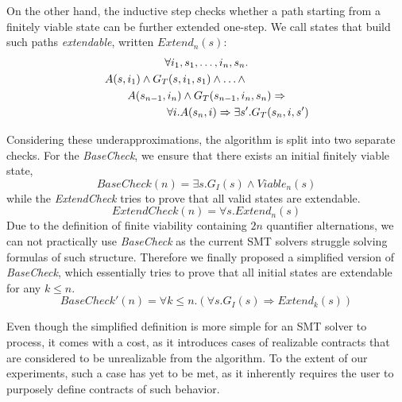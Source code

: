 On the other hand, the inductive step checks whether a path starting from a
finitely viable state can be further extended one-step. We call states that
build such paths \textit{extendable}, written $Extend_{n}(s)$:
	\begin{multline}
	\label{ml:extendable}
		\forall i_1,s_1,\ldots,i_n,s_n. \\
		\hspace{-2cm} A(s,i_1) \wedge G_T(s,i_1,s_1) \wedge \ldots \wedge \\
		A(s_{n-1}, i_n) \wedge G_T(s_{n-1},i_n,s_n) \Rightarrow \\
		\hspace{+2cm} \forall i. A(s_n,i) \Rightarrow \exists s'. G_T(s_n,i,s')
	\end{multline}
	
Considering these underapproximations, the algorithm is split into two separate
checks. For the \textit{BaseCheck}, we ensure that there exists an initial
finitely viable state,
\begin{equation}
\label{bcheck}
BaseCheck(n) = \exists s. G_I(s) \wedge Viable_n(s)
\end{equation}
while the \textit{ExtendCheck} tries to prove that all
valid states are extendable.
\begin{equation}
\label{eq:echeck}
ExtendCheck(n) = \forall s. Extend_n(s)
\end{equation}
Due to the definition of finite viability containing $2n$
quantifier alternations, we can not practically use \textit{BaseCheck} as the
current SMT solvers struggle solving formulas of such structure. Therefore we
finally proposed a simplified version of \textit{BaseCheck}, which essentially
tries to prove that all initial states are extendable for any $k \leq n$.
\begin{equation}
\label{eq:sbcheck}
BaseCheck'(n) = \forall k \leq n. (\forall s. G_I(s)
	  	\Rightarrow Extend_k(s))
\end{equation}

Even though the simplified definition is more simple for an SMT solver to
process, it comes with a cost, as it introduces cases of realizable contracts
that are considered to be unrealizable from the algorithm. To the extent of our
experiments, such a case has yet to be met, as it inherently requires the user
to purposely define contracts of such behavior.

